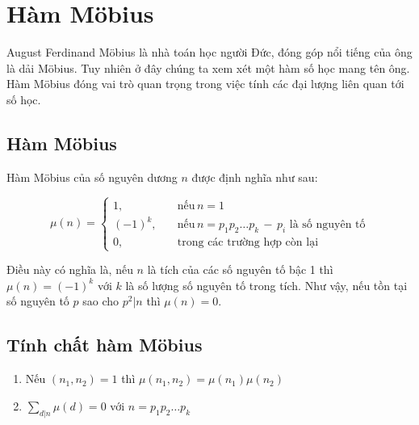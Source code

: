 \chapter{Hàm \foreignlanguage{german}{Möbius}}

\foreignlanguage{german}{August Ferdinand Möbius} là nhà toán học người Đức, đóng
góp nổi tiếng của ông là dải \foreignlanguage{german}{Möbius}. Tuy nhiên ở
đây chúng ta xem xét một hàm số học mang tên ông. Hàm \foreignlanguage{german}{Möbius}
đóng vai trò quan trọng trong việc tính các đại lượng liên quan tới số học.

\section{Hàm \foreignlanguage{german}{Möbius}}

\begin{definition}
    Hàm \foreignlanguage{german}{Möbius} của số nguyên dương $n$ được định nghĩa như sau:

    \begin{equation}
        \mu (n) = \begin{cases}
            1, \quad & \text{nếu}\, n = 1 \\
            (-1)^k, \quad & \text{nếu}\, n = p_1 p_2 \ldots p_k\,-\, p_i \text{ là số nguyên tố} \\
            0, \quad & \text{trong các trường hợp còn lại}
        \end{cases}
    \end{equation}
\end{definition}

Điều này có nghĩa là, nếu $n$ là tích của các số nguyên tố bậc 1 thì $\mu (n) = (-1)^k$
với $k$ là số lượng số nguyên tố trong tích. Như vậy, nếu tồn tại số nguyên tố
$p$ sao cho $p^2 \vert n$ thì $\mu(n) = 0$.

\section{Tính chất hàm \foreignlanguage{german}{Möbius}}

\begin{enumerate}
    \item Nếu $(n_1, n_2) = 1$ thì $\mu(n_1, n_2) = \mu(n_1) \mu(n_2)$
    \item $\displaystyle{\sum_{d \vert n} \mu(d) = 0}$ với $n = p_1 p_2 \ldots p_k$
\end{enumerate}

